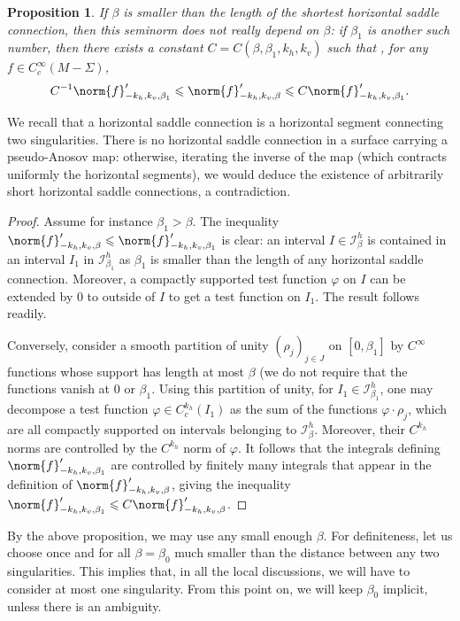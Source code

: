 \documentclass[11pt, a4paper, oneside, final, pagebackref]{amsart}
\newcommand{\boI}{\mathcal{I}}
\renewcommand{\phi}{\varphi}
\renewcommand{\leq}{\leqslant}
\newtheorem{prop}[thm]{Proposition}
\theoremstyle{definition}
\numberwithin{equation}{section}
\begin{document}
\begin{prop}
\label{prop:beta_irrelevant} If $\beta$ is smaller than the length of the
shortest horizontal saddle connection, then this seminorm does not really
depend on $\beta$: if $\beta_1$ is another such number, then there exists a
constant $C=C(\beta, \beta_1, k_h, k_v)$ such that , for any $f \in
C^\infty_c(M-\Sigma)$,
\begin{equation*}
C^{-1}\norm{f}'_{-k_h, k_v, \beta_1} \leq \norm{f}'_{-k_h, k_v, \beta} \leq C\norm{f}'_{-k_h, k_v, \beta_1}.
\end{equation*}
\end{prop}
We recall that a horizontal saddle connection is a horizontal segment
connecting two singularities. There is no horizontal saddle connection in a
surface carrying a pseudo-Anosov map: otherwise, iterating the inverse of the
map (which contracts uniformly the horizontal segments), we would deduce the
existence of arbitrarily short horizontal saddle connections, a
contradiction.
\begin{proof}
Assume for instance $\beta_1>\beta$. The inequality $\norm{f}'_{-k_h, k_v,
\beta} \leq \norm{f}'_{-k_h, k_v, \beta_1}$ is clear: an interval $I \in
\boI^h_\beta$ is contained in an interval $I_1$ in $\boI^h_{\beta_1}$ as
$\beta_1$ is smaller than the length of any horizontal saddle connection.
Moreover, a compactly supported test function $\phi$ on $I$ can be extended
by $0$ to outside of $I$ to get a test function on $I_1$. The result follows
readily.

Conversely, consider a smooth partition of unity $(\rho_j)_{j\in J}$ on
$[0,\beta_1]$ by $C^\infty$ functions whose support has length at most
$\beta$ (we do not require that the functions vanish at $0$ or $\beta_1$.
Using this partition of unity, for $I_1 \in \boI^h_{\beta_1}$, one may
decompose a test function $\phi\in C^{k_h}_c(I_1)$ as the sum of the
functions $\phi\cdot \rho_j$, which are all compactly supported on intervals
belonging to $\boI^h_{\beta}$. Moreover, their $C^{k_h}$ norms are controlled
by the $C^{k_h}$ norm of $\phi$. It follows that the integrals defining
$\norm{f}'_{-k_h, k_v, \beta_1}$ are controlled by finitely many integrals
that appear in the definition of $\norm{f}'_{-k_h, k_v, \beta}$, giving the
inequality $\norm{f}'_{-k_h, k_v, \beta_1} \leq C \norm{f}'_{-k_h, k_v,
\beta}$.
\end{proof}

By the above proposition, we may use any small enough $\beta$. For
definiteness, let us choose once and for all $\beta=\beta_0$ much smaller
than the distance between any two singularities. This implies that, in all
the local discussions, we will have to consider at most one singularity. From
this point on, we will keep $\beta_0$ implicit, unless there is an ambiguity.
\end{document}

